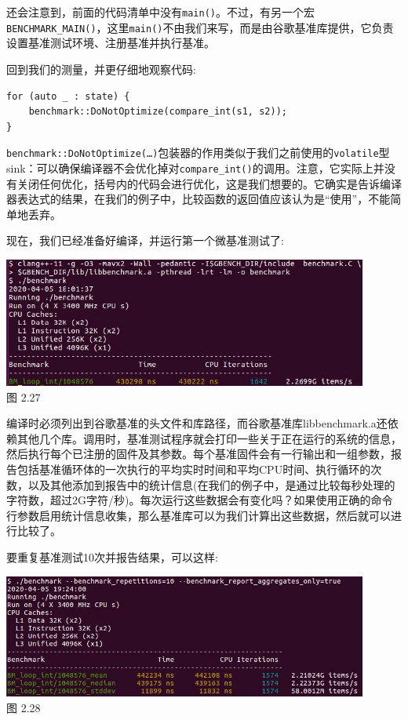 还会注意到，前面的代码清单中没有\texttt{main()}。不过，有另一个宏\texttt{BENCHMARK\_MAIN()}，这里\texttt{main()}不由我们来写，而是由谷歌基准库提供，它负责设置基准测试环境、注册基准并执行基准。

回到我们的测量，并更仔细地观察代码:

\begin{lstlisting}[style=styleCXX]
for (auto _ : state) {
	benchmark::DoNotOptimize(compare_int(s1, s2));
}
\end{lstlisting}

\texttt{benchmark::DoNotOptimize(…)}包装器的作用类似于我们之前使用的\texttt{volatile}型sink：可以确保编译器不会优化掉对\texttt{compare\_int()}的调用。注意，它实际上并没有关闭任何优化，括号内的代码会进行优化，这是我们想要的。它确实是告诉编译器表达式的结果，在我们的例子中，比较函数的返回值应该认为是“使用”，不能简单地丢弃。

现在，我们已经准备好编译，并运行第一个微基准测试了:

\begin{center}
\includegraphics[width=0.9\textwidth]{content/1/chapter2/images/27.jpg}\\
图 2.27
\end{center}

编译时必须列出到谷歌基准的头文件和库路径，而谷歌基准库libbenchmark.a还依赖其他几个库。调用时，基准测试程序就会打印一些关于正在运行的系统的信息，然后执行每个已注册的固件及其参数。每个基准固件会有一行输出和一组参数，报告包括基准循环体的一次执行的平均实时时间和平均CPU时间、执行循环的次数，以及其他添加到报告中的统计信息(在我们的例子中，是通过比较每秒处理的字符数，超过2G字符/秒)。每次运行这些数据会有变化吗？如果使用正确的命令行参数启用统计信息收集，那么基准库可以为我们计算出这些数据，然后就可以进行比较了。

要重复基准测试10次并报告结果，可以这样:

\begin{center}
\includegraphics[width=0.9\textwidth]{content/1/chapter2/images/28.jpg}\\
图 2.28
\end{center}

